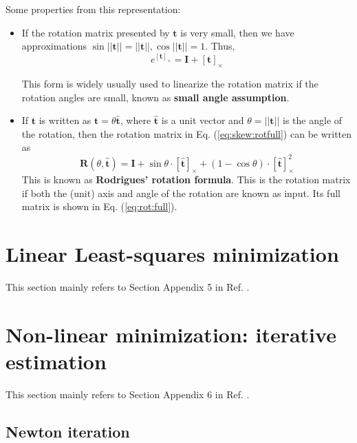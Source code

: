 \documentclass[12pt]{article}
\numberwithin{equation}{section}
\begin{document}
Some properties from this representation:
\begin{itemize}
\item If the rotation matrix presented by $\mathbf{t}$ is very small, then we have approximations $\sin||\mathbf{t}|| = ||\mathbf{t}||, \cos||\mathbf{t}|| = 1$. Thus,
\begin{equation}
e^{[\mathbf{t}]_{\times}} = \mathbf{I} + [\mathbf{t}]_{\times}
\label{eq:skew-rot-small}
\end{equation}

This form is widely usually used to linearize the rotation matrix if the rotation angles are small, known as \textbf{small angle assumption}.

\item If $\mathbf{t}$ is written as $\mathbf{t}= \theta \mathbf{\hat{t}}$, where $ \mathbf{\hat{t}}$ is a unit vector and $\theta = ||\mathbf{t}||$ is the angle of the rotation, then the rotation matrix in Eq. (\ref{eq:skew:rotfull}) can be written as
\begin{equation}
\mathbf{R}(\theta, \mathbf{\hat{t}}) = \mathbf{I} + \sin\theta \cdot [\mathbf{\hat{t}}]_{\times} + (1 - \cos\theta) \cdot [\mathbf{\hat{t}}]_{\times}^2
\label{eq:skew:rotangleaxis}
\end{equation}
This is known as \textbf{Rodrigues' rotation formula}. This is the rotation matrix if both the (unit) axis and angle of the rotation are known as input. Its full matrix is shown in Eq. (\ref{eq:rot:full}).
\end{itemize}

\newpage

\section{Linear Least-squares minimization}

This section mainly refers to Section Appendix 5 in Ref. \cite{hartley2003multiple}.


\newpage

\section{Non-linear minimization: iterative estimation}

This section mainly refers to Section Appendix 6 in Ref. \cite{hartley2003multiple}.

\subsection{Newton iteration}
\label{sec:nonlinear:newton}
\end{document}
